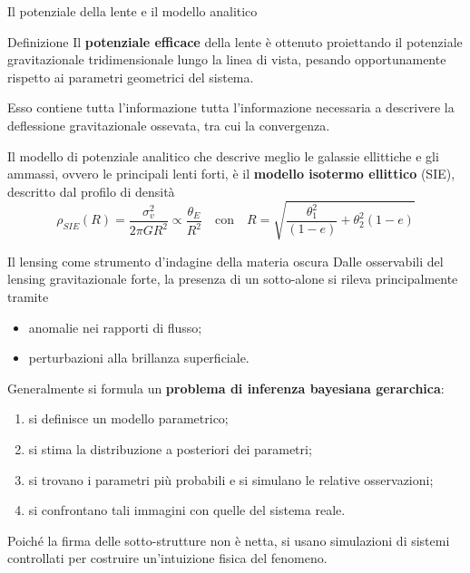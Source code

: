 \documentclass[aspectratio=169]{beamer}
\begin{document}
\begin{frame}{Il potenziale della lente e il modello analitico}
    \begin{block}{Definizione}
        Il \textbf{potenziale efficace} della lente è ottenuto proiettando il potenziale gravitazionale tridimensionale lungo la linea di vista, pesando opportunamente rispetto ai parametri geometrici del sistema.
    \end{block}
    Esso contiene tutta l'informazione tutta l'informazione necessaria a descrivere la deflessione gravitazionale ossevata, tra cui la convergenza.

    Il modello di potenziale analitico che descrive meglio le galassie ellittiche e gli ammassi, ovvero le principali lenti forti, è il \textbf{modello isotermo ellittico} (SIE), descritto dal profilo di densità
    \begin{equation*}
        \rho_{SIE}(R)=\frac{\sigma_v^2}{2\pi GR^2}\propto\frac{\theta_E}{R^2}\quad \text{con}\quad  R=\sqrt{\frac{\theta_1^2}{(1-e)}+\theta_2^2(1-e)}
        \label{eq:rho_SIE}
    \end{equation*}
\end{frame}
\begin{frame}{Il lensing come strumento d'indagine della materia oscura}
    Dalle osservabili del lensing gravitazionale forte, la presenza di un sotto-alone si rileva principalmente tramite
    \begin{itemize}
        \item anomalie nei rapporti di flusso;
        \item perturbazioni alla brillanza superficiale.
    \end{itemize}
    Generalmente si formula un \textbf{problema di inferenza bayesiana gerarchica}:
    \begin{enumerate}[1)]
        \item si definisce un modello parametrico;
        \item si stima la distribuzione a posteriori dei parametri;
        \item si trovano i parametri più probabili e si simulano le relative osservazioni;
        \item si confrontano tali immagini con quelle del sistema reale.
    \end{enumerate}
    Poiché la firma delle sotto-strutture non è netta, si usano simulazioni di sistemi controllati per costruire un'intuizione fisica del fenomeno.
\end{frame}
\end{document}

